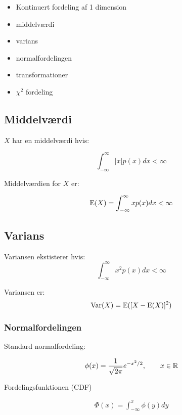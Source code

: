\begin{itemize}
    \item Kontinuert fordeling af 1 dimension
    \item middelværdi
    \item varians
    \item normalfordelingen
    \item transformationer
    \item $\chi^2$ fordeling
\end{itemize}

\subsection{Middelværdi}
$X$ har en middelværdi hvis: 

\begin{equation}
    \int_{- \infty}^{\infty} \lvert x \rvert p(x) dx < \infty
\end{equation}


Middelværdien for $X$ er:

\begin{equation}
    \text{E}(X) = \int_{- \infty}^{\infty} x p(x) dx < \infty
\end{equation}

\subsection{Varians}

Variansen ekstisterer hvis:
\begin{equation}
    \int_{-\infty}^{\infty}x^2 p(x) dx < \infty    
\end{equation}

Variansen er:
\begin{equation}
    \text{Var}(X) = \text{E}([X - \text{E}(X)]^2)
\end{equation}

\subsubsection{Normalfordelingen}

Standard normalfordeling:

\begin{equation}
    \phi(x) = \frac{1}{\sqrt{2\pi}}e^{-x^2/2},\qquad x \in \mathbb{R}
\end{equation}

Fordelingsfunktionen (CDF)

\begin{align}
    \Phi(x) = \int_{-\infty}^{x} \phi(y)dy
\end{align}

